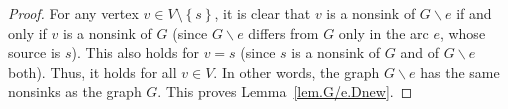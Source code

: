 \documentclass[12pt]{amsart}
\theoremstyle{definition}
\newcommand{\set}[1]{\left\{ #1 \right\}}
\begin{document}
\begin{proof}
For any vertex $v \in V \setminus \set{s}$, it is clear that
$v$ is a nonsink of $G \backslash e$ if and only if $v$ is a nonsink of $G$
(since $G \backslash e$ differs from $G$ only in the arc $e$,
whose source is $s$).
This also holds for $v = s$ (since $s$ is a nonsink of $G$ and of $G \backslash e$ both).
Thus, it holds for all $v \in V$.
In other words, the graph $G \backslash e$ has the same nonsinks as the graph $G$.
This proves Lemma~\ref{lem.G/e.Dnew}. %
% 
% 
% 
% 
% 
% 
% 
% 
% 
% 
% 
\end{proof}
\end{document}
